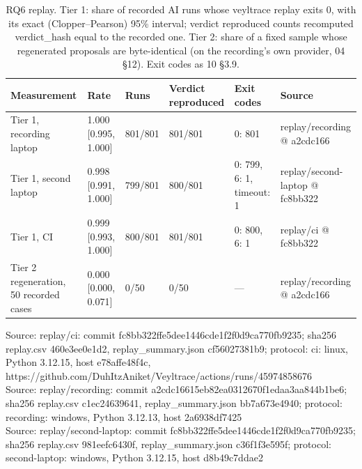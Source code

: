 \begin{table}[t]
\centering
\caption{RQ6 replay. Tier 1: share of recorded AI runs whose veyltrace replay exits 0, with its exact (Clopper--Pearson) 95\% interval; verdict reproduced counts recomputed verdict\_hash equal to the recorded one. Tier 2: share of a fixed sample whose regenerated proposals are byte-identical (on the recording's own provider, 04 \S{}12). Exit codes as 10 \S{}3.9.}
\label{tab:t09-rq6-replay}
\small
\begin{tabular}{llllll}
\hline
Measurement & Rate & Runs & Verdict reproduced & Exit codes & Source \\
\hline
Tier 1, recording laptop & 1.000 [0.995, 1.000] & 801/801 & 801/801 & 0: 801 & replay/recording @ a2cdc166 \\
Tier 1, second laptop & 0.998 [0.991, 1.000] & 799/801 & 800/801 & 0: 799, 6: 1, timeout: 1 & replay/second-laptop @ fc8bb322 \\
Tier 1, CI & 0.999 [0.993, 1.000] & 800/801 & 801/801 & 0: 800, 6: 1 & replay/ci @ fc8bb322 \\
Tier 2 regeneration, 50 recorded cases & 0.000 [0.000, 0.071] & 0/50 & 0/50 & --- & replay/recording @ a2cdc166 \\
\hline
\end{tabular}
\par\smallskip\footnotesize
Source: replay/ci: commit fc8bb322ffe5dee1446cde1f2f0d9ca770fb9235; sha256 replay.csv 460e3ee0e1d2, replay\_summary.json cf56027381b9; protocol: ci: linux, Python 3.12.15, host e78affe48f4c, https://github.com/DuhItzAniket/Veyltrace/actions/runs/45974858676\\
Source: replay/recording: commit a2cdc16615eb82ea0312670f1edaa3aa844b1be6; sha256 replay.csv c1ec24639641, replay\_summary.json bb7a673e4940; protocol: recording: windows, Python 3.12.13, host 2a6938df7425\\
Source: replay/second-laptop: commit fc8bb322ffe5dee1446cde1f2f0d9ca770fb9235; sha256 replay.csv 981eefc6430f, replay\_summary.json c36f1f3e595f; protocol: second-laptop: windows, Python 3.12.15, host d8b49c7ddae2\\
\end{table}

